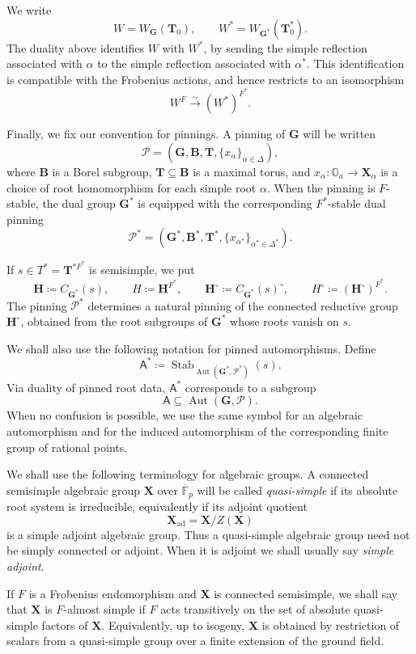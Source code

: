 \documentclass{amsart}
\theoremstyle{plain}
\numberwithin{equation}{section}
\theoremstyle{definition}
\newcommand{\cP}{\mathcal{P}}
\newcommand{\Stab}{\operatorname{Stab}}
\newcommand{\Aut}{\operatorname{Aut}}
\newcommand{\bG}{\mathbf{G}}
\newcommand{\bT}{\mathbf{T}}
\newcommand{\bB}{\mathbf{B}}
\newcommand{\bH}{\mathbf{H}}
\newcommand{\bX}{\mathbf{X}}
\newcommand{\A}{\mathsf{A}}
\begin{document}
We write
\[
W=W_{\bG}(\bT_0),
\qquad
W^*=W_{\bG^*}(\bT_0^*).
\]
The duality above identifies \(W\) with \(W^*\), by sending the simple
reflection associated with \(\alpha\) to the simple reflection associated with
\(\alpha^*\).  This identification is compatible with the Frobenius actions,
and hence restricts to an isomorphism
\[
W^F\xrightarrow{\sim} (W^*)^{F^*}.
\]

Finally, we fix our convention for pinnings.  A pinning of \(\bG\) will be
written
\[
\cP=(\bG,\bB,\bT,\{x_\alpha\}_{\alpha\in\Delta}),
\]
where \(\bB\) is a Borel subgroup, \(\bT\subseteq\bB\) is a maximal torus, and
\(x_\alpha:\mathbb G_a\to \bX_\alpha\) is a choice of root homomorphism for
each simple root \(\alpha\).  When the pinning is \(F\)-stable, the dual group
\(\bG^*\) is equipped with the corresponding \(F^*\)-stable dual pinning
\[
\cP^*=(\bG^*,\bB^*,\bT^*,\{x_{\alpha^*}\}_{\alpha^*\in\Delta^*}).
\]

If \(s\in T^*=\bT^{*F^*}\) is semisimple, we put
\[
\bH\coloneqq C_{\bG^*}(s),
\qquad
H\coloneqq \bH^{F^*},
\qquad
\bH^\circ\coloneqq C_{\bG^*}(s)^\circ,
\qquad
H^\circ\coloneqq (\bH^\circ)^{F^*}.
\]
The pinning \(\cP^*\) determines a natural pinning of the connected reductive
group \(\bH^\circ\), obtained from the root subgroups of \(\bG^*\) whose roots
vanish on \(s\).

We shall also use the following notation for pinned automorphisms.  Define
\[
\A^*
\coloneqq
\Stab_{\Aut(\bG^*,\cP^*)}(s).
\]
Via duality of pinned root data, \(\A^*\) corresponds to a subgroup
\[
\A\subseteq \Aut(\bG,\cP).
\]
When no confusion is possible, we use the same symbol for an algebraic
automorphism and for the induced automorphism of the corresponding finite group
of rational points.

We shall use the following terminology for algebraic groups.  A connected
semisimple algebraic group \(\mathbf X\) over \(\overline{\mathbb F}_p\) will
be called \emph{quasi-simple} if its absolute root system is irreducible,
equivalently if its adjoint quotient
\[
        \mathbf X_{\mathrm{ad}}=\mathbf X/Z(\mathbf X)
\]
is a simple adjoint algebraic group.  Thus a quasi-simple algebraic group need
not be simply connected or adjoint.  When it is adjoint we shall usually say
\emph{simple adjoint}.

If \(F\) is a Frobenius endomorphism and \(\mathbf X\) is connected
semisimple, we shall say that \(\mathbf X\) is \(F\)-almost simple if \(F\)
acts transitively on the set of absolute quasi-simple factors of \(\mathbf X\).
Equivalently, up to isogeny, \(\mathbf X\) is obtained by restriction of
scalars from a quasi-simple group over a finite extension of the ground field.
\end{document}
